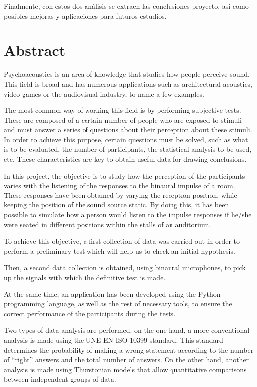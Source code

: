 \documentclass[11pt,a4paper]{book}
\begin{document}
    Finalmente, con estos dos análisis se extraen las conclusiones proyecto, así como posibles mejoras y aplicaciones para futuros estudios.
    
    \chapter*{Abstract}
    Psychoacoustics is an area of knowledge that studies how people perceive sound. This field is broad and has numerous applications such as architectural acoustics, video games or the audiovisual industry, to name a few examples.

    The most common way of working this field is by performing subjective tests. These are composed of a certain number of people who are exposed to stimuli and must answer a series of questions about their perception about these stimuli. In order to achieve this purpose, certain questions must be solved, such as what is to be evaluated, the number of participants, the statistical analysis to be used, etc. These characteristics are key to obtain useful data for drawing conclusions.

    In this project, the objective is to study how the perception of the participants varies with the listening of the responses to the binaural impulse of a room. These responses have been obtained by varying the reception position, while keeping the position of the sound source static. By doing this, it has been possible to simulate how a person would listen to the impulse responses if he/she were seated in different positions within the stalls of an auditorium.

    To achieve this objective, a first collection of data was carried out in order to perform a preliminary test which will help us to check an initial hypothesis. 

    Then, a second data collection is obtained, using binaural microphones, to pick up the signals with which the definitive test is made.

    At the same time, an application has been developed using the Python programming language, as well as the rest of necessary tools, to ensure the correct performance of the participants during the tests.

    Two types of data analysis are performed: on the one hand, a more conventional analysis is made using the UNE-EN ISO 10399 standard. This standard determines the probability of making a wrong statement according to the number of ``right'' answers and the total number of answers. On the other hand, another analysis is made using Thurstonian models that allow quantitative comparisons between independent groups of data.
\end{document}
